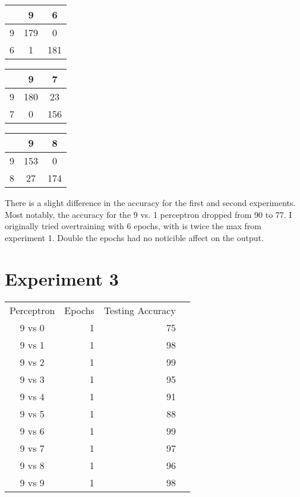 \documentclass[12pt]{article}
\begin{document}
\begin{multicols}{3}
			\begin{tabular}{| c | c | c |}
				\hline
				& 9 & 6 \\ 
				\hline
				9 & 179 & 0 \\ 
				\hline
				6 & 1 & 181 \\ 
				\hline
			\end{tabular}
			\newline


			\begin{tabular}{| c | c | c |}
				\hline
				& 9 & 7 \\ 
				\hline
				9 & 180 & 23 \\ 
				\hline
				7 & 0 & 156 \\ 
				\hline
			\end{tabular}
			\newline


			\begin{tabular}{| c | c | c |}
				\hline
				& 9 & 8 \\ 
				\hline
				9 & 153 & 0 \\ 
				\hline
				8 & 27 & 174 \\ 
				\hline
			\end{tabular}
			\newline

        \end{multicols}
        There is a slight difference in the accuracy for the first and second experiments.  Most notably, the accuracy for the 9 vs. 1 perceptron dropped from 90
        to 77.  I originally tried overtraining with 6 epochs, with is twice the max from experiment 1.  Double the epochs had no noticible affect on the output.
    \pagebreak
    \section*{Experiment 3}

		\begin{tabular}{ | c || r | r | r |}
			\hline
			 Perceptron & Epochs & Testing Accuracy \\ 
			 9 vs 0 & 1 & 75 \\ 
			\hline
			 9 vs 1 & 1 & 98 \\ 
			\hline
			 9 vs 2 & 1 & 99 \\ 
			\hline
			 9 vs 3 & 1 & 95 \\ 
			\hline
			 9 vs 4 & 1 & 91 \\ 
			\hline
			 9 vs 5 & 1 & 88 \\ 
			\hline
			 9 vs 6 & 1 & 99 \\ 
			\hline
			 9 vs 7 & 1 & 97 \\ 
			\hline
			 9 vs 8 & 1 & 96 \\ 
			\hline
			 9 vs 9 & 1 & 98 \\ 
			\hline
		\end{tabular}
\end{document}
